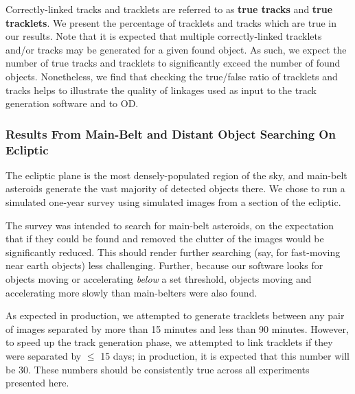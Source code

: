 \documentclass[12pt,preprint]{aastex}
\begin{document}
Correctly-linked tracks and tracklets are referred to as \textbf{true
  tracks} and \textbf{true tracklets}. We present the percentage of
tracklets and tracks which are true in our results. Note that it is
expected that multiple correctly-linked tracklets and/or tracks may be
generated for a given found object. As such, we expect the number of
true tracks and tracklets to significantly exceed the number of found
objects.  Nonetheless, we find that checking the true/false ratio of
tracklets and tracks helps to illustrate the quality of linkages used
as input to the track generation software and to OD.





\subsubsection{Results From Main-Belt and Distant Object Searching On Ecliptic}

The ecliptic plane is the most densely-populated region of the sky,
and main-belt asteroids generate the vast majority of detected objects
there.  We chose to run a simulated one-year survey using simulated
images from a section of the ecliptic.  

The survey was intended to search for main-belt asteroids, on the
expectation that if they could be found and removed the clutter of the
images would be significantly reduced. This should render further
searching (say, for fast-moving near earth objects) less challenging.
Further, because our software looks for objects moving or accelerating
\textit{below} a set threshold, objects moving and accelerating more
slowly than main-belters were also found.


As expected in production, we attempted to generate tracklets between
any pair of images separated by more than 15 minutes and less than
90 minutes.  However, to speed up the track generation phase, we
attempted to link tracklets if they were separated by $\leq$ 15 days;
in production, it is expected that this number will be 30.  These
numbers should be consistently true across all experiments presented
here.
\end{document}

